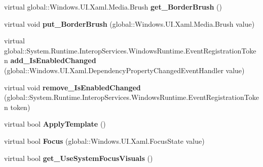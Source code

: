 \begin{DoxyCompactItemize}
\item 
\mbox{\label{class_windows_1_1_u_i_1_1_xaml_1_1_controls_1_1_control_a71ff5e84affd65e6419e6e3f9a2292b9}} 
virtual global\+::\+Windows.\+U\+I.\+Xaml.\+Media.\+Brush {\bfseries get\+\_\+\+Border\+Brush} ()
\item 
\mbox{\label{class_windows_1_1_u_i_1_1_xaml_1_1_controls_1_1_control_a551a318818f8d5853d61b020af44db11}} 
virtual void {\bfseries put\+\_\+\+Border\+Brush} (global\+::\+Windows.\+U\+I.\+Xaml.\+Media.\+Brush value)
\item 
\mbox{\label{class_windows_1_1_u_i_1_1_xaml_1_1_controls_1_1_control_a825185d5afd2516710efebaeb9350f9d}} 
virtual global\+::\+System.\+Runtime.\+Interop\+Services.\+Windows\+Runtime.\+Event\+Registration\+Token {\bfseries add\+\_\+\+Is\+Enabled\+Changed} (global\+::\+Windows.\+U\+I.\+Xaml.\+Dependency\+Property\+Changed\+Event\+Handler value)
\item 
\mbox{\label{class_windows_1_1_u_i_1_1_xaml_1_1_controls_1_1_control_ae6492dba1a06b7283e52b7e05df6ba01}} 
virtual void {\bfseries remove\+\_\+\+Is\+Enabled\+Changed} (global\+::\+System.\+Runtime.\+Interop\+Services.\+Windows\+Runtime.\+Event\+Registration\+Token token)
\item 
\mbox{\label{class_windows_1_1_u_i_1_1_xaml_1_1_controls_1_1_control_acdc49d1356465906f233a94118f9fc61}} 
virtual bool {\bfseries Apply\+Template} ()
\item 
\mbox{\label{class_windows_1_1_u_i_1_1_xaml_1_1_controls_1_1_control_af09f0101a93f914e3ea713e2afd6cbc5}} 
virtual bool {\bfseries Focus} (global\+::\+Windows.\+U\+I.\+Xaml.\+Focus\+State value)
\item 
\mbox{\label{class_windows_1_1_u_i_1_1_xaml_1_1_controls_1_1_control_a1f599dcf33ab7480ed9700961d478ab9}} 
virtual bool {\bfseries get\+\_\+\+Use\+System\+Focus\+Visuals} ()

\end{DoxyCompactItemize}
